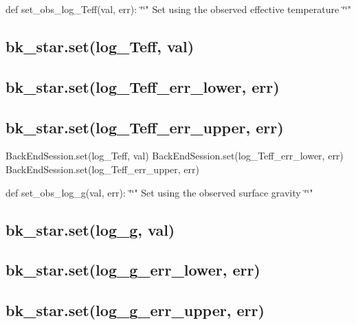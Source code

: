 def set\+\_\+obs\+\_\+log\+\_\+\+Teff(val, err)\+: \char`\"{}\char`\"{}" Set using the observed effective temperature \char`\"{}\char`\"{}" \subsection*{bk\+\_\+star.\+set(\textquotesingle{}log\+\_\+\+Teff\textquotesingle{}, val)}

\subsection*{bk\+\_\+star.\+set(\textquotesingle{}log\+\_\+\+Teff\+\_\+err\+\_\+lower\textquotesingle{}, err)}

\subsection*{bk\+\_\+star.\+set(\textquotesingle{}log\+\_\+\+Teff\+\_\+err\+\_\+upper\textquotesingle{}, err)}

Back\+End\+Session.\+set(\textquotesingle{}log\+\_\+\+Teff\textquotesingle{}, val) Back\+End\+Session.\+set(\textquotesingle{}log\+\_\+\+Teff\+\_\+err\+\_\+lower\textquotesingle{}, err) Back\+End\+Session.\+set(\textquotesingle{}log\+\_\+\+Teff\+\_\+err\+\_\+upper\textquotesingle{}, err) 

def set\+\_\+obs\+\_\+log\+\_\+g(val, err)\+: \char`\"{}\char`\"{}" Set using the observed surface gravity \char`\"{}\char`\"{}" \subsection*{bk\+\_\+star.\+set(\textquotesingle{}log\+\_\+g\textquotesingle{}, val)}

\subsection*{bk\+\_\+star.\+set(\textquotesingle{}log\+\_\+g\+\_\+err\+\_\+lower\textquotesingle{}, err)}

\subsection*{bk\+\_\+star.\+set(\textquotesingle{}log\+\_\+g\+\_\+err\+\_\+upper\textquotesingle{}, err)}

